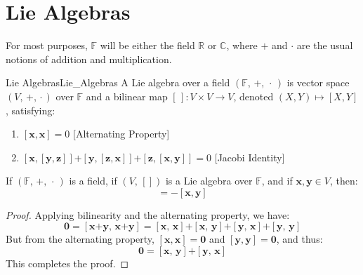 
\section{Lie Algebras}
    For most purposes, $\mathbb{F}$ will be either the field $\mathbb{R}$
    or $\mathbb{C}$, where $+$ and $\cdot$ are the usual notions of
    addition and multiplication.
    \begin{fdefinition}{Lie Algebras}{Lie_Algebras}
        A Lie algebra over a field $(\mathbb{F},\,+,\,\cdot\,)$
        is vector space $(V,\,\boldsymbol{+},\,\boldsymbol{\cdot}\,)$
        over $\mathbb{F}$ and a bilinear map
        $[\,]:V\times{V}\rightarrow{V}$, denoted $(X,Y)\mapsto[X,Y]$,
        satisfying:
        \begin{enumerate}
            \item $[\mathbf{x},\mathbf{x}]=0$
                  \hfill[Alternating Property]
            \item $[\mathbf{x},[\mathbf{y},\mathbf{z}]]%
                   \boldsymbol{+}[\mathbf{y},[\mathbf{z},\mathbf{x}]]%
                   \boldsymbol{+}[\mathbf{z},[\mathbf{x},\mathbf{y}]]=0$
                  \hfill[Jacobi Identity]
        \end{enumerate}
    \end{fdefinition}
    \begin{theorem}
        \label{thm:Lie_Bracket_Anti_Commutes}%
        If $(\mathbb{F},\,+,\,\cdot\,)$ is a field, if $(V,\,[])$ is a
        Lie algebra over $\mathbb{F}$, and if
        $\mathbf{x},\mathbf{y}\in{V}$, then:
        \begin{equation}
            [\mathbf{x},\mathbf{y}]=\minus[\mathbf{x},\mathbf{y}]
        \end{equation}
    \end{theorem}
    \begin{proof}
        Applying bilinearity and the alternating property, we have:
        \begin{equation}
            \mathbf{0}=[\mathbf{x}\boldsymbol{+}\mathbf{y},\,
                        \mathbf{x}\boldsymbol{+}\mathbf{y}]
                      =[\mathbf{x},\,\mathbf{x}]\boldsymbol{+}
                       [\mathbf{x},\,\mathbf{y}]\boldsymbol{+}
                       [\mathbf{y},\,\mathbf{x}]\boldsymbol{+}
                       [\mathbf{y},\,\mathbf{y}]
        \end{equation}
        But from the alternating property,
        $[\mathbf{x},\mathbf{x}]=\mathbf{0}$ and
        $[\mathbf{y},\mathbf{y}]=\mathbf{0}$, and thus:
        \begin{equation}
            \mathbf{0}=[\mathbf{x},\,\mathbf{y}]\boldsymbol{+}
                       [\mathbf{y},\,\mathbf{x}]
        \end{equation}
        This completes the proof.
    \end{proof}
